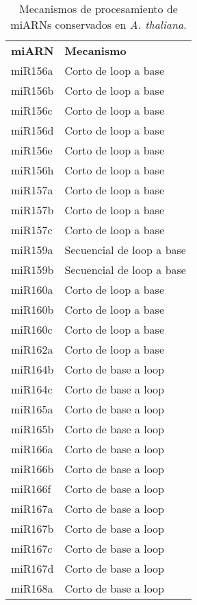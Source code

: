 \begin{table}[htbp!]
\tiny
\centering
\caption{Mecanismos de procesamiento de miARNs conservados en \textit{A. thaliana}.}
\label{table:mecanismos}
\begin{tabular}{ll}
\textbf{miARN} & \textbf{Mecanismo}        \\
miR156a        & Corto de loop a base      \\
miR156b        & Corto de loop a base      \\
miR156c        & Corto de loop a base      \\
miR156d        & Corto de loop a base      \\
miR156e        & Corto de loop a base      \\
miR156h        & Corto de loop a base      \\
miR157a        & Corto de loop a base      \\
miR157b        & Corto de loop a base      \\
miR157c        & Corto de loop a base      \\
miR159a        & Secuencial de loop a base \\
miR159b        & Secuencial de loop a base \\
miR160a        & Corto de loop a base      \\
miR160b        & Corto de loop a base      \\
miR160c        & Corto de loop a base      \\
miR162a        & Corto de loop a base      \\
miR164b        & Corto de base a loop      \\
miR164c        & Corto de base a loop      \\
miR165a        & Corto de base a loop      \\
miR165b        & Corto de base a loop      \\
miR166a        & Corto de base a loop      \\
miR166b        & Corto de base a loop      \\
miR166f        & Corto de base a loop      \\
miR167a        & Corto de base a loop      \\
miR167b        & Corto de base a loop      \\
miR167c        & Corto de base a loop      \\
miR167d        & Corto de base a loop      \\
miR168a        & Corto de base a loop      \\

\end{tabular}
\end{table}
